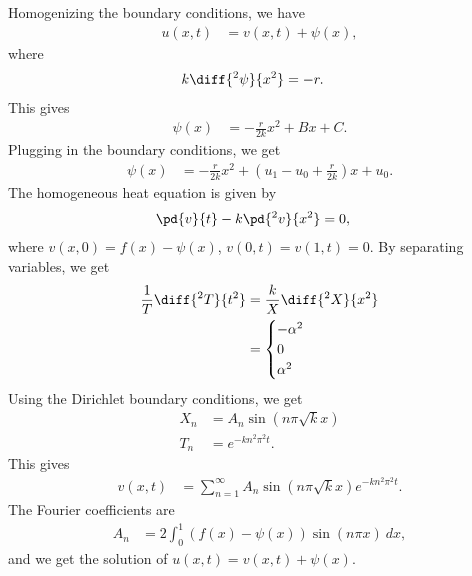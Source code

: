 \documentclass[10pt]{mypackage}
\begin{document}
\begin{solution}[12.6, Problem 4]
  Homogenizing the boundary conditions, we have
  \begin{align*}
    u\left( x,t \right) &= v\left( x,t \right) + \psi(x),
  \end{align*}
  where
  \begin{align*}
    k\diff{^2\psi}{x^2} &= -r.
  \end{align*}
  This gives
  \begin{align*}
    \psi\left( x \right) &= -\frac{r}{2k}x^2 + Bx + C.
  \end{align*}
  Plugging in the boundary conditions, we get
  \begin{align*}
    \psi(x) &= -\frac{r}{2k}x^2 + \left( u_1 - u_0 + \frac{r}{2k} \right)x + u_0.
  \end{align*}
  The homogeneous heat equation is given by
  \begin{align*}
    \pd{v}{t} - k\pd{^2v}{x^2} &= 0,
  \end{align*}
  where $v\left( x,0 \right) = f(x) - \psi(x)$, $v\left( 0,t  \right) = v\left( 1,t \right) = 0$. By separating variables, we get
  \begin{align*}
    \frac{1}{T}\diff{^2T}{t^2} &= \frac{k}{X}\diff{^2X}{x^2}\\
                               &= \begin{cases}
                                 -\alpha^2\\
                                 0\\
                                 \alpha^2
                               \end{cases}
  \end{align*}
  Using the Dirichlet boundary conditions, we get
  \begin{align*}
    X_n &= A_n\sin\left( n\pi\sqrt{k} x \right)\\
    T_n &= e^{-kn^2\pi^2 t}.
  \end{align*}
  This gives
  \begin{align*}
    v\left( x,t \right) &= \sum_{n=1}^{\infty}A_n\sin\left( n\pi\sqrt{k}x \right)e^{-kn^2\pi^2 t}.
  \end{align*}
  The Fourier coefficients are
  \begin{align*}
    A_n &= 2 \int_{0}^{1} \left( f(x)-\psi(x) \right)\sin\left( n\pi x \right)\:dx,
  \end{align*}
  and we get the solution of $u\left( x,t \right) = v\left( x,t \right) + \psi(x)$.
\end{solution}
\begin{solution}[12.6, Problem 10]

\end{solution}
\begin{solution}

\end{solution}
\end{document}

